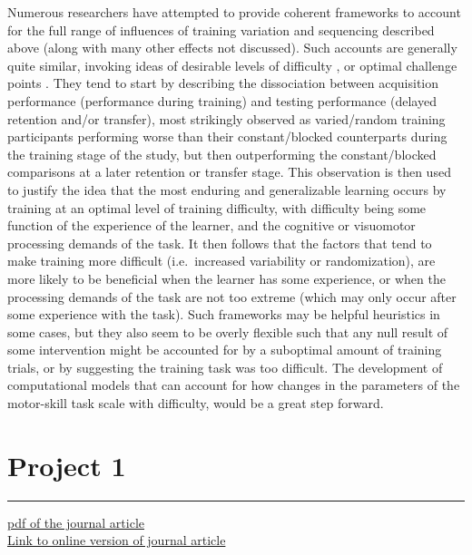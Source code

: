 \documentclass[
  12pt,
  letterpaper,
]{article}
\begin{document}
Numerous researchers have attempted to provide coherent frameworks to
account for the full range of influences of training variation and
sequencing described above (along with many other effects not
discussed). Such accounts are generally quite similar, invoking ideas of
desirable levels of difficulty
\autocite{bjorkNewTheoryDisuse1992,schmidtNewConceptualizationsPractice1992},
or optimal challenge points
\autocite{guadagnoliChallengePointFramework2004}. They tend to start by
describing the dissociation between acquisition performance (performance
during training) and testing performance (delayed retention and/or
transfer), most strikingly observed as varied/random training
participants performing worse than their constant/blocked counterparts
during the training stage of the study, but then outperforming the
constant/blocked comparisons at a later retention or transfer stage.
This observation is then used to justify the idea that the most enduring
and generalizable learning occurs by training at an optimal level of
training difficulty, with difficulty being some function of the
experience of the learner, and the cognitive or visuomotor processing
demands of the task. It then follows that the factors that tend to make
training more difficult (i.e.~increased variability or randomization),
are more likely to be beneficial when the learner has some experience,
or when the processing demands of the task are not too extreme (which
may only occur after some experience with the task). Such frameworks may
be helpful heuristics in some cases, but they also seem to be overly
flexible such that any null result of some intervention might be
accounted for by a suboptimal amount of training trials, or by
suggesting the training task was too difficult. The development of
computational models that can account for how changes in the parameters
of the motor-skill task scale with difficulty, would be a great step
forward.

\section{Project 1}\label{project-1}

\begin{center}\rule{0.5\linewidth}{0.5pt}\end{center}

\href{Assets/Gorman_Goldstone_2022_Instance-based_model_varied_practice.pdf}{pdf
of the journal article}\\
\href{https://www.sciencedirect.com/science/article/abs/pii/S0010028522000299}{Link
to online version of journal article}
\end{document}
